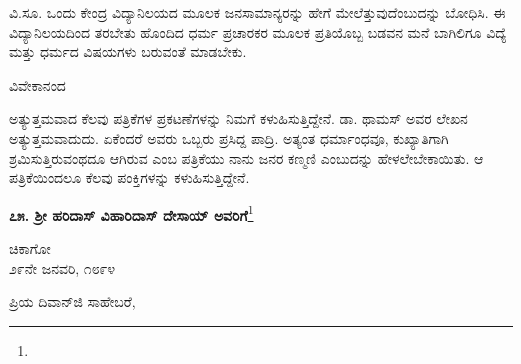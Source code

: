 ವಿ.ಸೂ. \enginline{-}ಒಂದು ಕೇಂದ್ರ ವಿದ್ಯಾನಿಲಯದ ಮೂಲಕ ಜನಸಾಮಾನ್ಯರನ್ನು ಹೇಗೆ ಮೇಲೆತ್ತುವುದೆಂಬುದನ್ನು ಬೋಧಿಸಿ. ಈ ವಿದ್ಯಾನಿಲಯದಿಂದ ತರಬೇತು ಹೊಂದಿದ ಧರ್ಮ ಪ್ರಚಾರಕರ ಮೂಲಕ ಪ್ರತಿಯೊಬ್ಬ ಬಡವನ ಮನೆ ಬಾಗಿಲಿಗೂ ವಿದ್ಯೆ ಮತ್ತು ಧರ್ಮದ ವಿಷಯಗಳು ಬರುವಂತೆ ಮಾಡಬೇಕು.

\vspace{-0.5cm}

\begin{flushright}
ವಿವೇಕಾನಂದ
\end{flushright}

ಅತ್ಯುತ್ತಮವಾದ ಕೆಲವು ಪತ್ರಿಕೆಗಳ ಪ್ರಕಟಣೆಗಳನ್ನು ನಿಮಗೆ ಕಳುಹಿಸುತ್ತಿದ್ದೇನೆ. ಡಾ. ಥಾಮಸ್ ಅವರ ಲೇಖನ ಅತ್ಯುತ್ತಮವಾದುದು. ಏಕೆಂದರೆ ಅವರು ಒಬ್ಬರು ಪ್ರಸಿದ್ದ ಪಾದ್ರಿ. ಅತ್ಯಂತ ಧರ್ಮಾಂಧವೂ, ಕುಖ್ಯಾತಿಗಾಗಿ ಶ್ರಮಿಸುತ್ತಿರುವಂಥದೂ ಆಗಿರುವ  ಎಂಬ ಪತ್ರಿಕೆಯು ನಾನು ಜನರ ಕಣ್ಮಣಿ ಎಂಬುದನ್ನು ಹೇಳಲೇಬೇಕಾಯಿತು. ಆ ಪತ್ರಿಕೆಯಿಂದಲೂ ಕೆಲವು ಪಂಕ್ತಿಗಳನ್ನು ಕಳುಹಿಸುತ್ತಿದ್ದೇನೆ.

\begin{center}
\textbf{೭೫. ಶ‍್ರೀ ಹರಿದಾಸ್ ವಿಹಾರಿದಾಸ್ ದೇಸಾಯ್ ಅವರಿಗೆ}\footnote{}
\end{center}


\vspace{-0.6cm}

\begin{flushright}
ಚಿಕಾಗೋ\\೨೯ನೇ ಜನವರಿ, ೧೮೯೪
\end{flushright}

\vspace{-0.5cm}

\noindent
ಪ್ರಿಯ ದಿವಾನ್‌ಜಿ ಸಾಹೇಬರೆ,

